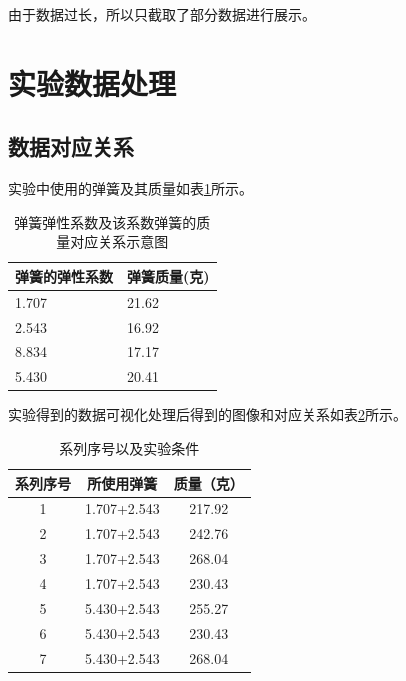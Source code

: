 \documentclass{ctexart}
\begin{document}
由于数据过长，所以只截取了部分数据进行展示。
\newpage

\section{实验数据处理}

  \subsection{数据对应关系}
  实验中使用的弹簧及其质量如表\ref{tanhuang}所示。
  \begin{table}[H]
    \centering   
    \caption{弹簧弹性系数及该系数弹簧的质量对应关系示意图}\label{tanhuang}
    \begin{tabular}{| l || l |}
        \hline
        弹簧的弹性系数 & 弹簧质量(克)\\
        \hline
        1.707 & 21.62 \\
        \hline
        2.543 & 16.92 \\
        \hline
        8.834 & 17.17 \\
        \hline
        5.430 & 20.41 \\
        \hline                       
    \end{tabular}
  \end{table}

  实验得到的数据可视化处理后得到的图像和对应关系如表\ref{guanxi}所示。
  \begin{table}[H]
    \centering   
    \caption{系列序号以及实验条件}\label{guanxi}
    \begin{tabular}{| c || c || c |}
        \hline
        系列序号 & 所使用弹簧 & 质量（克）\\
        \hline
        1 & 1.707+2.543 & 217.92\\
        \hline
        2 & 1.707+2.543 & 242.76\\
        \hline
        3 & 1.707+2.543 & 268.04\\
        \hline
        4 & 1.707+2.543 & 230.43\\
        \hline
        5 & 5.430+2.543 & 255.27\\
        \hline   
        6 & 5.430+2.543 & 230.43\\
        \hline
        7 & 5.430+2.543 & 268.04\\
        \hline                             
    \end{tabular}
  \end{table}
\end{document}
